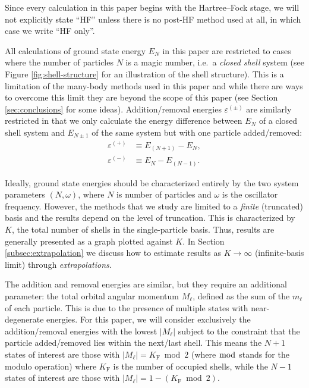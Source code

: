 Since every calculation in this paper begins with the Hartree--Fock stage, we will not explicitly state ``HF'' unless there is no post-HF method used at all, in which case we write ``HF only''.

All calculations of ground state energy $E_N$ in this paper are restricted to cases where the number of particles $N$ is a magic number, i.e.\ a \textit{closed shell} system (see Figure \ref{fig:shell-structure} for an illustration of the shell structure).  This is a limitation of the many-body methods used in this paper and while there are ways to overcome this limit they are beyond the scope of this paper (see Section \ref{sec:conclusions} for some ideas).  Addition/removal energies $\varepsilon^{(\pm)}$ are similarly restricted in that we only calculate the energy difference between $E_N$ of a closed shell system and $E_{N \pm 1}$ of the same system but with one particle added/removed:
\begin{align*}
  \varepsilon^{(+)} &\equiv E_{(N + 1)} - E_N, \\
  \varepsilon^{(-)} &\equiv E_N - E_{(N - 1)}.
\end{align*}

Ideally, ground state energies should be characterized entirely by the two system parameters $(N, \omega)$, where $N$ is number of particles and $\omega$ is the oscillator frequency.  However, the methods that we study are limited to a \emph{finite} (truncated) basis and the results depend on the level of truncation.  This is characterized by $K$, the total number of shells in the single-particle basis.  Thus, results are generally presented as a graph plotted against $K$.  In Section \ref{subsec:extrapolation} we discuss how to estimate results as $K \to \infty$ (infinite-basis limit) through \textit{extrapolations}.

The addition and removal energies are similar, but they require an additional parameter: the total orbital angular momentum $M_\ell$, defined as the sum of the $m_\ell$ of each particle.  This is due to the presence of multiple states with near-degenerate energies.  For this paper, we will consider exclusively the addition/removal energies with the lowest $|M_\ell|$ subject to the constraint that the particle added/removed lies within the next/last shell.  This means the $N + 1$ states of interest are those with $|M_\ell| = K_{\mathrm{F}} \bmod 2$ (where $\bmod$ stands for the modulo operation) where $K_{\mathrm{F}}$ is the number of occupied shells, while the $N - 1$ states of interest are those with $|M_\ell| = 1 - (K_{\mathrm{F}} \bmod 2)$.

